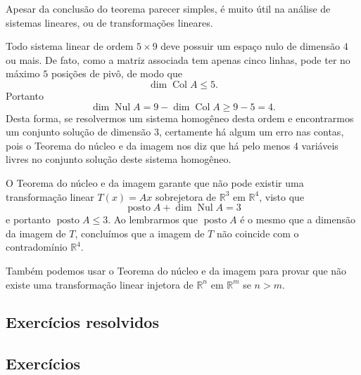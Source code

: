 Apesar da conclusão do teorema parecer simples, é muito útil na análise de sistemas lineares, ou de transformações lineares.

\begin{ex}
	Todo sistema linear de ordem $5 \times 9$ deve possuir um espaço nulo de dimensão $4$ ou mais. De fato, como a matriz associada tem apenas cinco linhas, pode ter no máximo $5$ posições de pivô, de modo que
	\begin{equation}
	\operatorname{dim} \operatorname{Col} A \le 5.
	\end{equation} Portanto
	\begin{equation}
	\operatorname{dim} \operatorname{Nul} A = 9 - \operatorname{dim} \operatorname{Col} A \ge 9 - 5 = 4.
	\end{equation} Desta forma, se resolvermos um sistema homogêneo desta ordem e encontrarmos um conjunto solução de dimensão 3, certamente  há algum um erro nas contas, pois o Teorema do núcleo e da imagem nos diz que há pelo menos 4 variáveis livres no conjunto solução deste sistema homogêneo. 
\end{ex}

\begin{ex}
 O Teorema do núcleo e da imagem garante que não pode existir uma transformação linear $T(x)=Ax$ sobrejetora de $ \mathbb{R}^3$ em  $ \mathbb{R}^4$, visto que 
 \begin{equation}
 \operatorname{posto} A + \operatorname{dim} \operatorname{Nul} A = 3
 \end{equation}
 e portanto $\operatorname{posto} A  \leq 3$. Ao lembrarmos que  $\operatorname{posto} A$ é o mesmo que a dimensão da imagem de $T$, concluímos que a imagem de $T$ não coincide com o contradomínio $ \mathbb{R}^4 $.
\end{ex}
 Também podemos usar o Teorema do núcleo e da imagem para provar que não existe uma transformação linear injetora de 
 $ \mathbb{R}^n$ em $ \mathbb{R}^m$ se $n>m$.













\subsection*{Exercícios resolvidos}

\construirExeresol

\subsection*{Exercícios}

